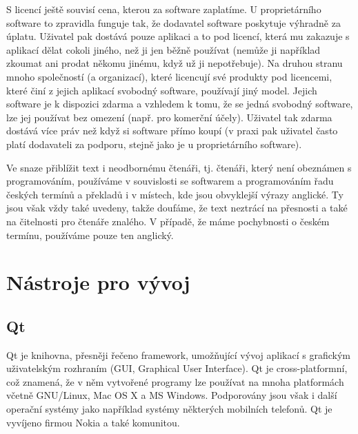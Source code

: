 \documentclass[a4paper,10pt]{article}
\begin{document}
S licencí ještě souvisí cena, kterou za software zaplatíme.
U proprietárního software to zpravidla funguje tak, že dodavatel software poskytuje výhradně za úplatu.
Uživatel pak dostává pouze aplikaci a to pod licencí, která mu zakazuje s aplikací dělat cokoli jiného, než ji jen běžně používat (nemůže ji například zkoumat ani prodat někomu jinému, když už ji nepotřebuje).
Na druhou stranu mnoho společností (a organizací), které licencují své produkty pod licencemi, které činí z jejich aplikací svobodný software, používají jiný model.
Jejich software je k dispozici zdarma a vzhledem k tomu, že se jedná svobodný software, lze jej používat bez omezení (např. pro komerční účely).
Uživatel tak zdarma dostává více práv než když si software přímo koupí (v praxi pak uživatel často platí dodavateli za podporu, stejně jako je u proprietárního software).

Ve snaze přiblížit text i neodbornému čtenáři, tj. čtenáři, který není obeznámen s programováním, používáme v souvislosti se softwarem a programováním řadu českých termínů a překladů i v místech, kde jsou obvyklejší výrazy anglické.
Ty jsou však vždy také uvedeny, takže doufáme, že text neztrácí na přesnosti a také na čitelnosti pro čtenáře znalého.
V případě, že máme pochybnosti o českém termínu, používáme pouze ten anglický.

\section{Nástroje pro vývoj}

\subsection{Qt}
Qt je knihovna, přesněji řečeno framework, umožňující vývoj aplikací s grafickým uživatelským rozhraním (GUI, Graphical User Interface).
Qt je cross-platformní, což znamená, že v něm vytvořené programy lze používat na mnoha platformách včetně GNU/Linux, Mac OS X a MS Windows.
Podporovány jsou však i další operační systémy jako například systémy některých mobilních telefonů.
Qt je vyvíjeno firmou Nokia a také komunitou.
\end{document}
